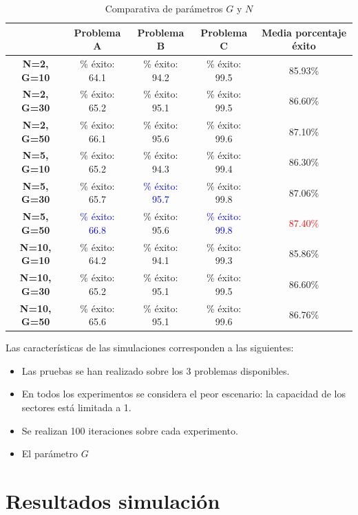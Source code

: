 \begin{table}[H]
	\centering
	\caption{Comparativa de parámetros $G$ y $N$}
	\label{tab: comparativa de parámetros $G$ y $N$}
	\begin{tabular}{|c|c|c|c|c|}
		\hline
		& \textbf{Problema A} & \textbf{Problema B} & \textbf{Problema C} & \textbf{Media porcentaje éxito} \\ \hline
		\textbf{N=2, G=10} & \% éxito: 64.1 & \% éxito: 94.2 &\% éxito: 99.5 & 85.93\% \\ \hline
		\textbf{N=2, G=30} & \% éxito: 65.2 & \% éxito: 95.1 &\% éxito: 99.5  & 86.60\%\\ \hline
		\textbf{N=2, G=50} & \% éxito: 66.1  & \% éxito: 95.6  &\% éxito: 99.6 & 87.10\%\\ \hline
		\textbf{N=5, G=10} & \% éxito: 65.2  & \% éxito: 94.3 &\% éxito: 99.4  &86.30\%\\ \hline
		\textbf{N=5, G=30} & \% éxito: 65.7  &\textcolor{blue}{\% éxito: 95.7 } &\% éxito: 99.8 &87.06\% \\ \hline
		\textbf{N=5, G=50} & \textcolor{blue}{\% éxito: 66.8} &\% éxito: 95.6  & \textcolor{blue}{\% éxito: 99.8}  &\textcolor{red}{87.40\%} \\ \hline
		\textbf{N=10, G=10} & \% éxito: 64.2  &\% éxito: 94.1  &\% éxito: 99.3  &85.86\% \\  \hline
		\textbf{N=10, G=30} & \% éxito: 65.2  &\% éxito: 95.1  &\% éxito: 99.5  &86.60\% \\ \hline
		\textbf{N=10, G=50} & \% éxito: 65.6  &\% éxito: 95.1  &\% éxito: 99.6  &86.76\% \\ \hline
	\end{tabular}	
\end{table}

Las características de las simulaciones corresponden a las siguientes:
\begin{itemize}
	\item Las pruebas se han realizado sobre los 3 problemas disponibles.
	\item En todos los experimentos se considera el peor escenario: la capacidad de los sectores está limitada a 1.
	\item Se realizan 100 iteraciones sobre cada experimento.
	\item El parámetro $G$
\end{itemize}

\section{Resultados simulación}
